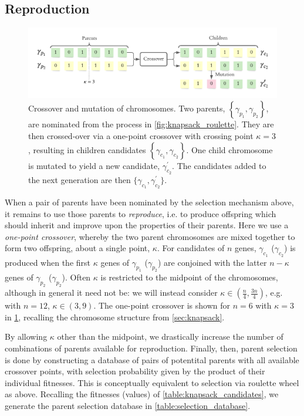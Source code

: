 \subsection{Reproduction}
\label{sec:reproduction}
\begin{figure}
    \begin{center}
        \includegraphics{theoretical_study/figures/chromosomes.pdf}
    \end{center}
    \caption[Crossover and mutation of chromosomes]{
        Crossover and mutation of chromosomes.
        Two parents, $\left\{\gamma_{p_1}, \gamma_{p_2}\right\}$, are nominated from the process in \cref{fig:knapsack_roulette}. 
        They are then crossed-over via a one-point crossover with crossing point $\kappa=3$, 
        resulting in children candidates $\left\{\gamma_{c_1}, \gamma_{c_2}\right\}$. 
        One child chromosome is mutated to yield a new candidate, $\gamma_{c_2}^{\prime}$. 
        The candidates added to the next generation are then $\{ \gamma_{c_1}, \gamma_{c_2}^{\prime} \}$.
    }
    \label{fig:gen_alg_reproduction}
\end{figure}

When a pair of parents have been nominated by the selection mechanism above, 
    it remains to use those parents to \emph{reproduce}, 
    i.e. to produce offspring which should inherit and improve upon the properties of their parents. 
Here we use a \emph{one-point crossover}, whereby the two parent chromosomes are mixed together 
    to form two offspring, about a single point, $\kappa$.
For candidates of $n$ genes, $\gamma_{c_1}$ ($\gamma_{c_2}$) is produced when
    the first $\kappa$ genes of $\gamma_{p_1}$ ($\gamma_{p_2}$) are conjoined with the latter $n - \kappa$ genes of $\gamma_{p_2}$ ($\gamma_{p_2}$).
Often $\kappa$ is restricted to the midpoint of the chromosomes, although in general it need not be: 
    we will instead consider $\kappa \in \left( \frac{n}{4}, \frac{3n}{4} \right)$, 
    e.g. with $n=12$, $\kappa \in (3, 9)$. 
The one-point crossover is shown for $n=6$ with $\kappa=3$ in \cref{fig:gen_alg_reproduction}, 
    recalling the chromosome structure from \cref{sec:knapsack}.
\par 
By allowing $\kappa$ other than the midpoint, we drastically increase the number of combinations of parents available for reproduction. 
Finally, then, parent selection is done by constructing a database of pairs of potentital parents with all available crossover points, 
    with selection probability given by the product of their individual fitnesses. 
This is conceptually equivalent to selection via roulette wheel as above. 
Recalling the fitnesses (values) of \cref{table:knapsack_candidates}, we generate the parent selection database
    in \cref{table:selection_database}.

